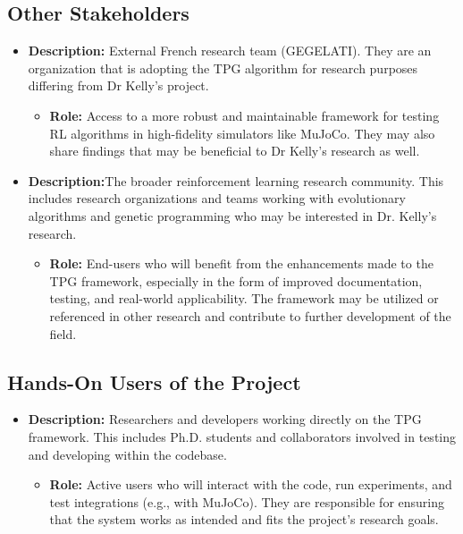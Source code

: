 \documentclass[12pt]{article}
\begin{document}
\subsection{Other Stakeholders}
\begin{itemize}

\item \textbf{Description:} External French research team (GEGELATI). They are an organization that is adopting the TPG algorithm for research purposes differing from Dr Kelly’s project.
\begin{itemize}
  \item \textbf{Role:} Access to a more robust and maintainable framework for testing RL algorithms in high-fidelity simulators like MuJoCo. They may also share findings that may be beneficial to Dr Kelly’s research as well.

\end{itemize}


\item \textbf{Description:}The broader reinforcement learning research community. This includes research organizations and teams working with evolutionary algorithms and genetic programming who may be interested in Dr. Kelly’s research.
\begin{itemize}
  \item \textbf{Role:} End-users who will benefit from the enhancements made to the TPG framework, especially in the form of improved documentation, testing, and real-world applicability. The framework may be utilized or referenced in other research and contribute to further development of the field.

\end{itemize}

\end{itemize}

\subsection{Hands-On Users of the Project}
\begin{itemize}
  \item \textbf{Description:}  Researchers and developers working directly on the TPG framework. This includes Ph.D. students and collaborators involved in testing and developing within the codebase.
    \begin{itemize}
      \item \textbf{Role:} Active users who will interact with the code, run experiments, and test integrations (e.g., with MuJoCo). They are responsible for ensuring that the system works as intended and fits the project's research goals.

    \end{itemize}

  \end{itemize}
\end{document}
